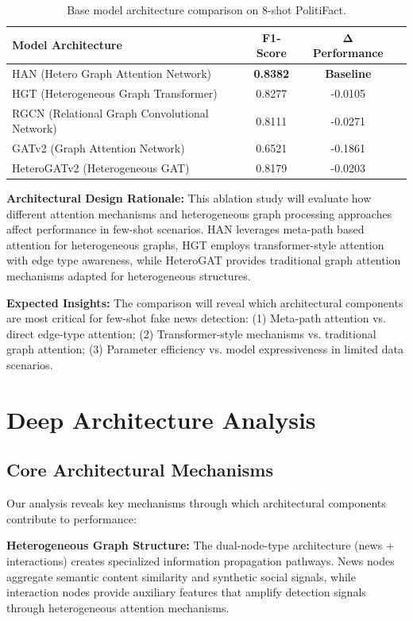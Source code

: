 \begin{table}[htbp]
\centering
\caption{Base model architecture comparison on 8-shot PolitiFact.}
\label{tab:base_model_ablation}
\begin{tabular}{lccc}
\toprule
\textbf{Model Architecture} & \textbf{F1-Score} & \textbf{Δ Performance} \\
\midrule
HAN (Hetero Graph Attention Network) & \textbf{0.8382} & \textbf{Baseline} \\
HGT (Heterogeneous Graph Transformer) & 0.8277 & -0.0105 \\
RGCN (Relational Graph Convolutional Network) & 0.8111 & -0.0271 \\
GATv2 (Graph Attention Network) & 0.6521 & -0.1861 \\ 
HeteroGATv2 (Heterogeneous GAT) & 0.8179 & -0.0203 \\
\bottomrule
\end{tabular}
\end{table}

\textbf{Architectural Design Rationale:} This ablation study will evaluate how different attention mechanisms and heterogeneous graph processing approaches affect performance in few-shot scenarios. HAN leverages meta-path based attention for heterogeneous graphs, HGT employs transformer-style attention with edge type awareness, while HeteroGAT provides traditional graph attention mechanisms adapted for heterogeneous structures.

\textbf{Expected Insights:} The comparison will reveal which architectural components are most critical for few-shot fake news detection: (1) Meta-path attention vs. direct edge-type attention; (2) Transformer-style mechanisms vs. traditional graph attention; (3) Parameter efficiency vs. model expressiveness in limited data scenarios.

\section{Deep Architecture Analysis}

\subsection{Core Architectural Mechanisms}

Our analysis reveals key mechanisms through which architectural components contribute to performance:

\textbf{Heterogeneous Graph Structure:} The dual-node-type architecture (news + interactions) creates specialized information propagation pathways. News nodes aggregate semantic content similarity and synthetic social signals, while interaction nodes provide auxiliary features that amplify detection signals through heterogeneous attention mechanisms.

